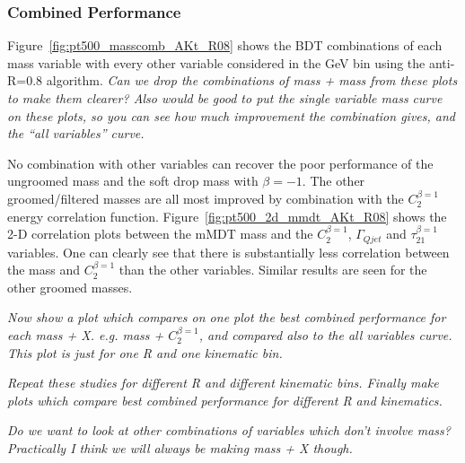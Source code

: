 \subsubsection{Combined Performance}

Figure~\ref{fig:pt500_masscomb_AKt_R08} shows the BDT combinations of each mass variable with every other
variable considered in the  GeV bin using the anti-\kT R=0.8
algorithm. {\it Can we drop the combinations of mass + mass
from these plots to make them clearer? Also would be good to put the
single variable mass curve on these plots, so you can see how much
improvement the combination gives, and the ``all variables'' curve.}

No combination with other variables can recover the poor performance
of the ungroomed mass and the soft drop mass with $\beta=-1$. The
other groomed/filtered masses are all most improved by combination
with the $C_{2}^{\beta=1}$ energy correlation
function. Figure~\ref{fig:pt500_2d_mmdt_AKt_R08} shows the 2-D
correlation plots between the mMDT mass and the $C_{2}^{\beta=1}$,
$\Gamma_{Qjet}$ and $\tau_{21}^{\beta=1}$ variables. One can clearly
see that there is substantially less correlation between the mass and
$C_{2}^{\beta=1}$ than the other variables. Similar results are seen
for the other groomed masses.

{\it Now show a plot which compares on one plot the best combined performance for
each mass + X. e.g. mass + $C_{2}^{\beta=1}$, and compared also to the
all variables curve. This plot is just for
one R and one kinematic bin.}

{\it Repeat these studies for different R and different kinematic
bins. Finally make plots which compare best combined performance for
different R and kinematics.}

{\it Do we want to look at other combinations of variables which don't
involve mass? Practically I think we will always be making mass + X though.}

